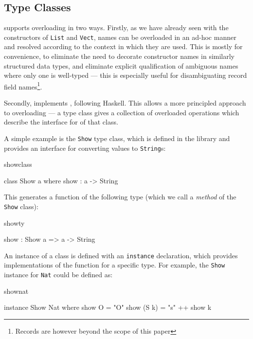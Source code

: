 \subsection{Type Classes}

\Idris{} supports overloading in two ways. Firstly, as we have already seen with
the constructors of \texttt{List} and \texttt{Vect}, names
can be overloaded in an ad-hoc manner and resolved according to the context in which
they are used. This is mostly for convenience, to eliminate the need to decorate
constructor names in similarly structured data types, and eliminate explicit qualification
of ambiguous names where only one is well-typed --- this is especially useful
for disambiguating record field names\footnote{Records are however beyond the scope
of this paper}.

Secondly, \Idris{} implements , following Haskell.  This
allows a more principled approach to overloading --- a type class gives a
collection of overloaded operations which describe the interface for
 of that class.

A simple example
is the \texttt{Show} type class, which is defined in the library and
provides an interface for converting values to
\texttt{String}s:

\begin{SaveVerbatim}{showclass}

class Show a where
    show : a -> String

\end{SaveVerbatim}

\noindent
This generates a function of the following type (which we call a \emph{method} of the 
\texttt{Show} class):

\begin{SaveVerbatim}{showty}

show : Show a => a -> String

\end{SaveVerbatim}

An instance of a class
is defined with an \texttt{instance} declaration, which provides implementations of
the function for a specific type. For example, the \texttt{Show} instance for \texttt{Nat}
could be defined as:

\begin{SaveVerbatim}{shownat}

instance Show Nat where
    show O = "O"
    show (S k) = "s" ++ show k

\end{SaveVerbatim}


